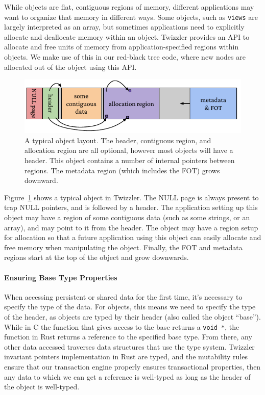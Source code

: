 While objects are flat, contiguous regions of memory, different applications may want to organize
that memory in different ways. Some objects, such as \texttt{views} are largely interpreted as an
array, but sometimes applications need to explicitly allocate and deallocate memory within an object.
Twizzler provides an API to allocate and free units of memory from application-specified regions
within objects. We make use of this in our red-black tree code, where new nodes are allocated out of
the object using this API.

\begin{figure}
    \centering
    \includegraphics[width=\linewidth]{fig/typobj}
    \caption{A typical object layout. The header, contiguous region, and allocation region are all
        optional, however most objects will have a header. This object contains a number of internal
        pointers between regions. The metadata region (which includes the FOT) grows downward.}
    \label{fig:typobj}
\end{figure}

Figure~\ref{fig:typobj} shows a typical object in Twizzler. The NULL page is always present to trap
NULL pointers, and is followed by a header. The application setting up this object may have a region
of some contiguous data (such as some strings, or an array), and may point to it from the header.
The object may have a region setup for allocation so that a future application using this
object can easily allocate and free memory when manipulating the object. Finally, the FOT and
metadata regions start at the top of the object and grow downwards.

\paragraph{Ensuring Base Type Properties}

When accessing persistent or shared data for the first time, it's necessary to specify the type of the data. For
objects, this means we need to specify the type of the header, as objects are typed by their header (also called the
object ``base''). While in C the function that gives access to the base returns a \texttt{void *}, the function in Rust
returns a reference to the specified base type. From there, any other data accessed traverses data structures that use
the type system. Twizzler invariant pointers implementation in Rust are typed, and the mutability rules ensure that our
transaction engine properly ensures transactional properties, then any data to which we can get a reference is
well-typed as long as the header of the object is well-typed.

